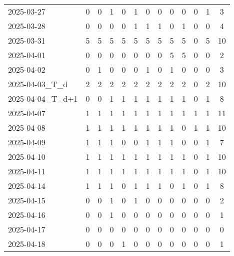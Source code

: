 \documentclass[dvipdfmx,oneside]{article}
\begin{document}
\begin{longtable}{lcccccccccccc}
        2025-03-27 &     0 &     0 &     1 &     0 &     1 &     0 &     0 &     0 &     0 &     0 &     1 &      3 \\
        2025-03-28 &     0 &     0 &     0 &     0 &     1 &     1 &     1 &     0 &     1 &     0 &     0 &      4 \\
        2025-03-31 &     5 &     5 &     5 &     5 &     5 &     5 &     5 &     5 &     5 &     0 &     5 &     10 \\
        2025-04-01 &     0 &     0 &     0 &     0 &     0 &     0 &     0 &     5 &     5 &     0 &     0 &      2 \\
        2025-04-02 &     0 &     1 &     0 &     0 &     0 &     1 &     0 &     1 &     0 &     0 &     0 &      3 \\
  2025-04-03\_T\_d &     2 &     2 &     2 &     2 &     2 &     2 &     2 &     2 &     2 &     0 &     2 &     10 \\
2025-04-04\_T\_d+1 &     0 &     0 &     1 &     1 &     1 &     1 &     1 &     1 &     1 &     0 &     1 &      8 \\
        2025-04-07 &     1 &     1 &     1 &     1 &     1 &     1 &     1 &     1 &     1 &     1 &     1 &     11 \\
        2025-04-08 &     1 &     1 &     1 &     1 &     1 &     1 &     1 &     1 &     0 &     1 &     1 &     10 \\
        2025-04-09 &     1 &     1 &     1 &     0 &     0 &     1 &     1 &     1 &     0 &     0 &     1 &      7 \\
        2025-04-10 &     1 &     1 &     1 &     1 &     1 &     1 &     1 &     1 &     1 &     0 &     1 &     10 \\
        2025-04-11 &     1 &     1 &     1 &     1 &     1 &     1 &     1 &     1 &     1 &     0 &     1 &     10 \\
        2025-04-14 &     1 &     1 &     1 &     0 &     1 &     1 &     1 &     0 &     1 &     0 &     1 &      8 \\
        2025-04-15 &     0 &     0 &     1 &     0 &     1 &     0 &     0 &     0 &     0 &     0 &     0 &      2 \\
        2025-04-16 &     0 &     0 &     1 &     0 &     0 &     0 &     0 &     0 &     0 &     0 &     0 &      1 \\
        2025-04-17 &     0 &     0 &     0 &     0 &     0 &     0 &     0 &     0 &     0 &     0 &     0 &      0 \\
        2025-04-18 &     0 &     0 &     0 &     1 &     0 &     0 &     0 &     0 &     0 &     0 &     0 &      1 \\

\end{longtable}
\end{document}
